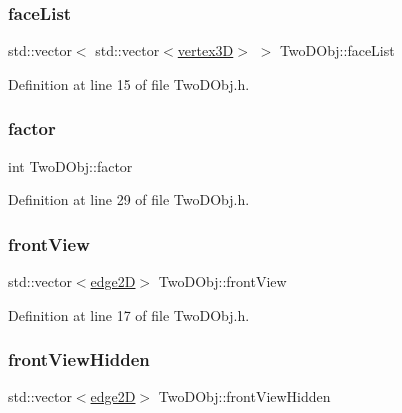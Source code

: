 \subsubsection{\texorpdfstring{face\+List}{faceList}}
{\footnotesize\ttfamily std\+::vector$<$ std\+::vector$<$\mbox{\hyperlink{structvertex3_d}{vertex3D}}$>$ $>$ Two\+D\+Obj\+::face\+List}



Definition at line 15 of file Two\+D\+Obj.\+h.

\mbox{\label{class_two_d_obj_a5ef060838790b5e927a9be217ca082e0}} 
\subsubsection{\texorpdfstring{factor}{factor}}
{\footnotesize\ttfamily int Two\+D\+Obj\+::factor}



Definition at line 29 of file Two\+D\+Obj.\+h.

\mbox{\label{class_two_d_obj_afd8b3b3be951e1a3f1461b9c2838d634}} 
\subsubsection{\texorpdfstring{front\+View}{frontView}}
{\footnotesize\ttfamily std\+::vector$<$\mbox{\hyperlink{structedge2_d}{edge2D}}$>$ Two\+D\+Obj\+::front\+View}



Definition at line 17 of file Two\+D\+Obj.\+h.

\mbox{\label{class_two_d_obj_a0358e12e432b205f285cb0b4d93c9b08}} 
\subsubsection{\texorpdfstring{front\+View\+Hidden}{frontViewHidden}}
{\footnotesize\ttfamily std\+::vector$<$\mbox{\hyperlink{structedge2_d}{edge2D}}$>$ Two\+D\+Obj\+::front\+View\+Hidden}



